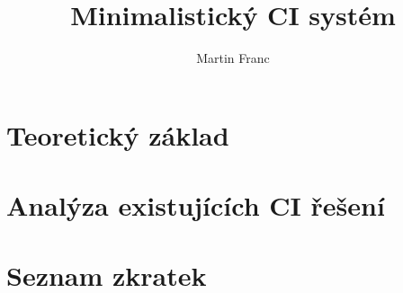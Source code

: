 \documentclass[thesis=B,czech]{template/FITthesisXE}
\title{Minimalistický CI systém}
\author{Martin Franc}
\begin{document}

\chapter{Teoretický základ}




\chapter{Analýza existujících CI řešení}








\printbibliography[]


\appendix

\chapter{Seznam zkratek}
\printglossary[type=\acronymtype,style=acronyms]



\end{document}
